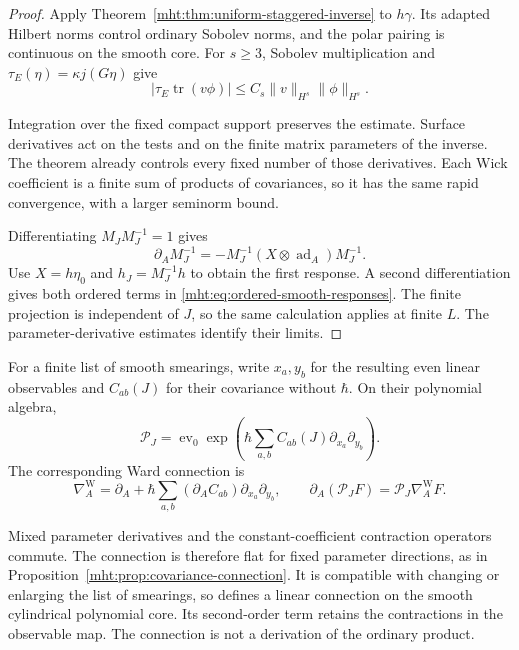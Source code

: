 \begin{proof}
Apply Theorem~\ref{mht:thm:uniform-staggered-inverse} to $h\gamma$.
Its adapted Hilbert norms control ordinary Sobolev norms, and the
polar pairing is continuous on the smooth core. For $s\geq3$,
Sobolev multiplication and $\tau_E(\eta)=\kappa j(G\eta)$ give
\[
 |\tau_E\operatorname{tr}(v\phi)|
       \leq C_s\|v\|_{H^s}\|\phi\|_{H^s}.
\]

Integration over the fixed compact support preserves the estimate.
Surface derivatives act on the tests and on the finite matrix
parameters of the inverse. The theorem already controls every
fixed number of those derivatives. Each Wick coefficient is a
finite sum of products of covariances, so it has the same rapid
convergence, with a larger seminorm bound.

Differentiating $M_JM_J^{-1}=1$ gives
\[
 \partial_A M_J^{-1}
       =-M_J^{-1}(X\otimes\operatorname{ad}_A)M_J^{-1}.
\]
Use $X=h\eta_0$ and $h_J=M_J^{-1}h$ to obtain the first response.
A second differentiation gives both ordered terms in
\eqref{mht:eq:ordered-smooth-responses}. The finite projection is
independent of $J$, so the same calculation applies at finite $L$.
The parameter-derivative estimates identify their limits.
\end{proof}

For a finite list of smooth smearings, write $x_a,y_b$ for the
resulting even linear observables and $C_{ab}(J)$ for their
covariance without $\hbar$. On their polynomial algebra,
\[
 \mathcal P_J=\operatorname{ev}_0
       \exp\left(\hbar\sum_{a,b}C_{ab}(J)
                           \partial_{x_a}\partial_{y_b}\right).
\]
The corresponding Ward connection is
\begin{equation}\label{mht:eq:smooth-ward-connection}
 \nabla_A^{\mathrm W}=\partial_A+
       \hbar\sum_{a,b}(\partial_AC_{ab})
                           \partial_{x_a}\partial_{y_b},
 \qquad
 \partial_A(\mathcal P_JF)=\mathcal P_J\nabla_A^{\mathrm W}F.
\end{equation}

Mixed parameter derivatives and the constant-coefficient
contraction operators commute. The connection is therefore flat
for fixed parameter directions, as in
Proposition~\ref{mht:prop:covariance-connection}. It is compatible
with changing or enlarging the list of smearings, so defines a
linear connection on the smooth cylindrical polynomial core.
Its second-order term retains the contractions in the observable
map. The connection is not a derivation of the ordinary product.

